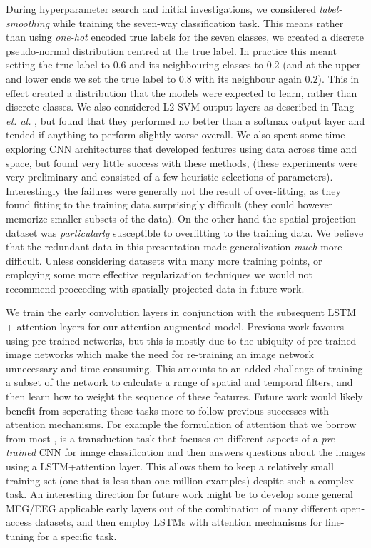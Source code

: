 \documentclass[fleqn,10pt]{wlscirep}
\begin{document}
During hyperparameter search and initial investigations, we considered {\em label-smoothing} \cite{Pereyra2017} while training the seven-way classification task. This means rather than using {\em one-hot} encoded true labels for the seven classes, we created a discrete pseudo-normal distribution centred at the true label. In practice this meant setting the true label to $0.6$ and its neighbouring classes to $0.2$ (and at the upper and lower ends we set the true label to $0.8$ with its neighbour again $0.2$). This in effect created a distribution that the models were expected to learn, rather than discrete classes. We also considered L2 SVM output layers as described in Tang {\em et. al.} \cite{Tang2013a}, but found that they performed no better than a softmax output layer and tended if anything to perform slightly worse overall. We also spent some time exploring CNN architectures that developed features using data across time and space, but found very little success with these methods, (these experiments were very preliminary and consisted of a few heuristic selections of parameters). Interestingly the failures were generally not the result of over-fitting, as they found fitting to the training data surprisingly difficult (they could however memorize smaller subsets of the data). On the other hand the spatial projection dataset was {\em particularly} susceptible to overfitting to the training data. We believe that the redundant data in this presentation made generalization {\em much} more difficult. Unless considering datasets with many more training points, or employing some more effective regularization techniques we would not recommend proceeding with spatially projected data in future work. 

We train the early convolution layers in conjunction with the subsequent LSTM + attention layers for our attention augmented model. Previous work favours using pre-trained networks, but this is mostly due to the ubiquity of pre-trained image networks which make the need for re-training an image network unnecessary and time-consuming. This amounts to an added challenge of training a subset of the network to calculate a range of spatial and temporal filters, and then learn how to weight the sequence of these features. Future work would likely benefit from seperating these tasks more to follow previous successes with attention mechanisms. For example the formulation of attention that we borrow from most \cite{Zhu}, is a transduction task that focuses on different aspects of a {\em pre-trained} CNN for image classification and then answers questions about the images using a LSTM+attention layer. This allows them to keep a relatively small training set (one that is less than one million examples) despite such a complex task. An interesting direction for future work might be to develop some general MEG/EEG applicable early layers out of the combination of many different open-access datasets, and then employ LSTMs with attention mechanisms for fine-tuning for a specific task.
\end{document}
